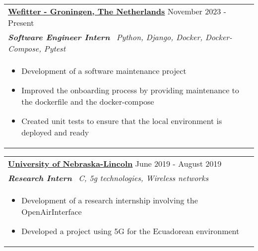 \documentclass[a4paper,8pt]{article}
\begin{document}
\begin{tabularx}{\linewidth}{ @{}l r@{} }
\textbf{\uline{\href{https://www.wefitter.com/en-us/}{Wefitter - Groningen, The Netherlands}}} \hfill \color[HTML]{371e77} November 2023 - Present \\[4pt]
\color[HTML]{371e77}\textbf{\textit{Software Engineer Intern}}\ \hfill \color[HTML]{4B28A4} \textit{Python, Django, Docker, Docker-Compose, Pytest} \\[5pt]
\begin{minipage}[t]{\linewidth}
    \begin{itemize}[nosep,after=\strut, leftmargin=2em, itemsep=2pt]
        \item Development of a software maintenance project
        \item Improved the onboarding process by providing maintenance to the dockerfile and the docker-compose
        \item Created unit tests to ensure that the local environment is deployed and ready
    \end{itemize}
\end{minipage}
\end{tabularx}

\begin{tabularx}{\linewidth}{ @{}l r@{} }
\textbf{\uline{\href{https://www.unl.edu/}{University of Nebraska-Lincoln}}} \hfill \color[HTML]{371e77} June 2019 - August 2019 \\[4pt]
\color[HTML]{371e77}\textbf{\textit{Research Intern}}\ \hfill \color[HTML]{4B28A4} \textit{C, 5g technologies, Wireless networks} \\[5pt]
\begin{minipage}[t]{\linewidth}
    \begin{itemize}[nosep,after=\strut, leftmargin=2em, itemsep=2pt]
        \item Development of a research internship involving the OpenAirInterface 
        \item Developed a project using 5G for the Ecuadorean environment
    \end{itemize}
\end{minipage}
\end{tabularx}
\end{document}
